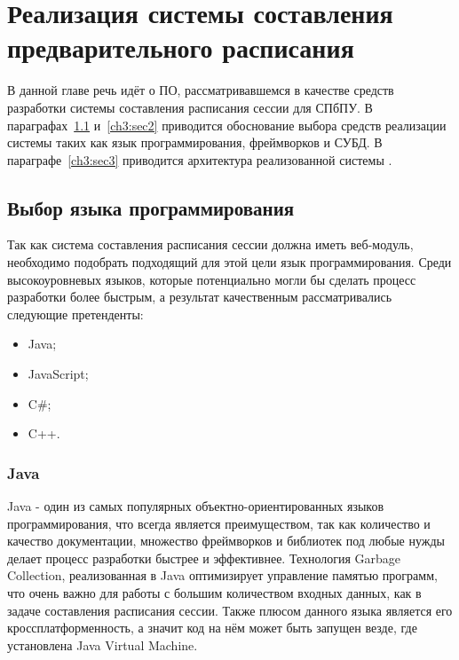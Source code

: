 \chapter{Реализация системы составления предварительного расписания} \label{ch3}
В данной главе речь идёт о ПО, рассматривавшемся в качестве средств разработки системы составления расписания сессии для СПбПУ. В параграфах~\ref{ch3:sec1} и~\ref{ch3:sec2} приводится обоснование выбора средств реализации системы таких как язык программирования, фреймворков и СУБД. В параграфе~\ref{ch3:sec3} приводится архитектура реализованной системы .


\section{Выбор языка программирования} \label{ch3:sec1}
Так как система составления расписания сессии должна иметь веб-модуль, необходимо подобрать подходящий для этой цели язык программирования. Среди высокоуровневых языков, которые потенциально могли бы сделать процесс разработки более быстрым, а результат качественным рассматривались следующие претенденты: 
\begin{itemize}
	\item  Java;
	\item  JavaScript;
	\item  C\#;	
	\item  C++.	
\end{itemize}

\subsection{Java}
Java - один из самых популярных объектно-ориентированных языков программирования, что всегда является преимуществом, так как количество и качество документации, множество фреймворков и библиотек под любые нужды делает процесс разработки быстрее и эффективнее. Технология Garbage Collection, реализованная в Java оптимизирует управление памятью программ, что очень важно для работы с большим количеством входных данных, как в задаче составления расписания сессии. Также плюсом данного языка является его кроссплатформенность, а значит код на нём может быть запущен везде, где установлена Java Virtual Machine. 

